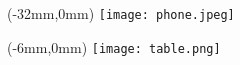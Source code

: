 \documentclass[12pt]{article}
\begin{document}
\begin{textblock*}{350mm}(-32mm,0mm)
	\texttt{[image: phone.jpeg]}
\end{textblock*}

\begin{textblock*}{350mm}(-6mm,0mm)%
	\texttt{[image: table.png]}
\end{textblock*}


\TPMargin{3mm}
\end{document}
